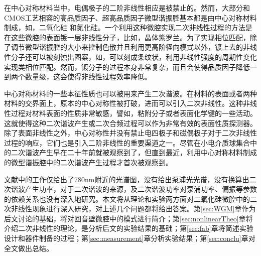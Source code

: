 	在中心对称材料当中，电偶极子的二阶非线性相应是被禁止的\cite{boyd2003nonlinear}。然而，大部分和CMOS工艺相容的高品质因子、超高品质因子微型谐振腔基本都是由中心对称材料制成，如，二氧化硅\cite{armani2003ultra, kippenberg2003fabrication}	和氮化硅\cite{levy2011harmonic}。一个利用这种微腔实现二次非线性过程的方法是在这些微腔的表面镀一层非线性分子\cite{xu2008second}，比如，晶体紫罗兰\cite{dominguez2011whispering}。为了实现相位匹配，除了调节微型谐振腔的大小来控制色散并且利用更高阶径向模式以外，镀上去的非线性分子还可以被刻蚀出图案，如，可以刻成条纹状，利用非线性强度的周期性变化实现类相位匹配\cite{dominguez2011whispering}。然而，镀分子的过程本身非常复杂，而且会使得品质因子降低一到两个数量级\cite{xu2008second}，这会使得非线性过程效率降低。
	
中心对称材料的一些本征性质也可以被用来产生二次谐波。在材料的表面或者两种材料的交界面上，原本的中心对称性被打破，进而可以引入二次非线性\cite{heinz1991second}。这种非线性过程对材料表面的性质非常敏感，譬如，粘附分子或者表面化学键的一些活动。这就使得这种二次谐波产生或二次合频过程可以作为非常有效的表面性质探测器\cite{shen1989surface, shank1983femtosecond, heinz1985study, tom1986investigation}。除了表面非线性之外，中心对称性并没有禁止电四极子和磁偶极子对于二次非线性过程的响应\cite{heinz1991second}，它们也是引入二阶非线性的重要渠道之一。尽管在小电介质球集合中的二次谐波产生早在二十年前就被观察到了\cite{martorell1997scattering, maymo2006visible, shan2006experimental}，但直到最近，利用中心对称材料制成的微型谐振腔中的二次谐波产生过程才首次被观察到\cite{asano2016visible}。
	
文献\cite{asano2016visible}中的工作仅给出了780nm附近的光谱图，没有给出泵浦光光谱，没有换算出二次谐波产生功率，对于二次谐波的来源，及二次谐波功率对泵浦功率、偏振等参数的依赖关系也没有深入地研究。本文将从理论和实验两方面对二氧化硅微腔中的二次非线性现象进行深入研究，对上述几个问题都将给出答案。第\ref{sec:WGM}章作为后文讨论的基础，将对回音壁微腔中的模式进行简介；第\ref{sec:nonlinearTheo}章将介绍二次非线性的理论，是分析后文的实验结果的基础；第\ref{sec:fab}章将简述实验设计和器件制备的过程；第\ref{sec:measurement}章分析实验结果；第\ref{sec:conclu}章对全文做出总结。
